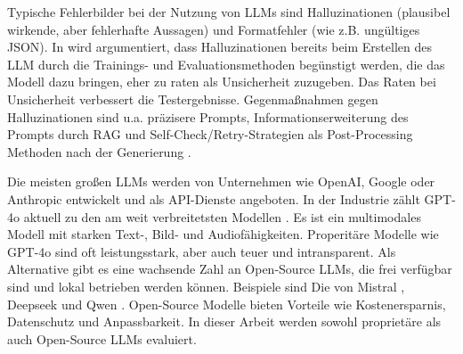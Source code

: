 Typische Fehlerbilder bei der Nutzung von \acp{LLM} sind Halluzinationen (plausibel wirkende, aber fehlerhafte Aussagen) und Formatfehler (wie z.B. ungültiges JSON). In \cite{kalai2025languagemodelshallucinate} wird argumentiert, dass Halluzinationen bereits beim Erstellen des \ac{LLM} durch die Trainings- und Evaluationsmethoden begünstigt werden, die das Modell dazu bringen, eher zu raten als Unsicherheit zuzugeben. Das Raten bei Unsicherheit verbessert die Testergebnisse. Gegenmaßnahmen gegen Halluzinationen sind u.a. präzisere Prompts, Informationserweiterung des Prompts durch \ac{RAG} und Self-Check/Retry-Strategien als Post-Processing Methoden nach der Generierung \cite{ji2023hallucinationsurvey}.

Die meisten großen \acp{LLM} werden von Unternehmen wie OpenAI, Google oder Anthropic entwickelt und als API-Dienste angeboten. In der Industrie zählt GPT-4o aktuell zu den am weit verbreitetsten Modellen \cite{openai-hello-gpt-4o}. Es ist ein multimodales Modell mit starken Text-, Bild- und Audiofähigkeiten. Properitäre Modelle wie GPT-4o sind oft leistungsstark, aber auch teuer und intransparent. Als Alternative gibt es eine wachsende Zahl an Open-Source \acp{LLM}, die frei verfügbar sind und lokal betrieben werden können. Beispiele sind Die von Mistral \cite{mistralai},
Deepseek \cite{deepseek} und Qwen \cite{qwen}. Open-Source Modelle bieten Vorteile wie Kostenersparnis, Datenschutz und Anpassbarkeit. In dieser Arbeit werden sowohl proprietäre als auch Open-Source \acp{LLM} evaluiert.